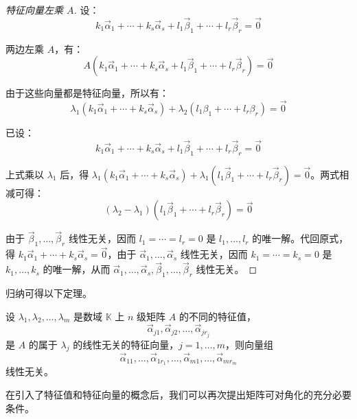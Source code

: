 \begin{proof}[特征向量左乘 $A$]
	设：
	$$
	k_1 \vec \alpha_1 + \cdots + k_s \vec \alpha_s + l_1 \vec \beta_1 + \cdots + l_r \vec \beta_r = \vec 0
	$$

	两边左乘 $A$，有：
	$$
	A (k_1 \vec \alpha_1 + \cdots + k_s \vec \alpha_s + l_1 \vec \beta_1 + \cdots + l_r \vec \beta_r) = \vec 0
	$$

	由于这些向量都是特征向量，所以有：
	$$
	\lambda_1(k_1 \vec \alpha_1 + \cdots + k_s \vec \alpha_s) + \lambda_2(l_1 \beta_1 + \cdots + l_r \beta_r) = \vec 0
	$$

	已设：
	$$
	k_1 \vec \alpha_1 + \cdots + k_s \vec \alpha_s + l_1 \vec \beta_1 + \cdots + l_r \vec \beta_r = \vec 0
	$$

	上式乘以 $\lambda_1$ 后，得 $\lambda_1(k_1 \vec \alpha_1 + \cdots + k_s \vec \alpha_s) + \lambda_1(l_1 \vec \beta_1 + \cdots + l_r \vec \beta_r) = \vec 0$。两式相减可得：
	$$
	(\lambda_2 - \lambda_1)(l_1 \vec \beta_1 + \cdots + l_r \vec \beta_r) = \vec 0
	$$

	由于 $\vec \beta_1, \ldots, \vec \beta_r$ 线性无关，因而 $l_1 = \cdots = l_r = 0$ 是 $l_1, \ldots, l_r$ 的唯一解。代回原式，得 $k_1 \vec \alpha_1 + \cdots + k_s \vec \alpha_s = \vec 0$，由于 $\vec \alpha_1, \ldots, \vec \alpha_s$ 线性无关，因而 $k_1 = \cdots = k_s = 0$ 是 $k_1, \ldots, k_s$ 的唯一解，从而 $\vec \alpha_1, \ldots, \vec \alpha_s, \vec \beta_1, \ldots, \vec \beta_r$ 线性无关。
\end{proof}

归纳可得以下定理。

\begin{theorem}
	设 $\lambda_1, \lambda_2, \ldots, \lambda_m$ 是数域 $\mathbb K$ 上 $n$ 级矩阵 $A$ 的不同的特征值，$$\vec \alpha_{j1}, \vec \alpha_{j2}, \ldots, \vec \alpha_{j r_j}$$ 是 $A$ 的属于 $\lambda_j$ 的线性无关的特征向量，$j = 1, \ldots, m$，则向量组 $$\vec \alpha_{11},\ldots, \vec \alpha_{1 r_1}, \ldots, \vec \alpha_{m1}, \ldots, \vec \alpha_{m r_m}$$ 线性无关。
\end{theorem}

\bigskip

在引入了特征值和特征向量的概念后，我们可以再次提出矩阵可对角化的充分必要条件。

